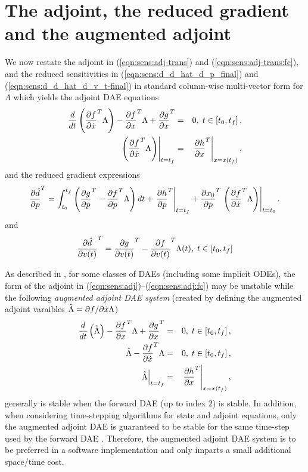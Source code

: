 \documentclass[pdf,ps2pdf,11pt]{SANDreport}
\begin{document}
%
\section{The adjoint, the reduced gradient and the augmented adjoint}
%

We now restate the adjoint in (\ref{eqn:sens:adj-trans}) and
(\ref{eqn:sens:adj-trans:fc}), and the reduced sensitivities in
(\ref{eqn:sens:d_d_hat_d_p_final}) and (\ref{eqn:sens:d_d_hat_d_v_t-final}) in
standard column-wise multi-vector form for $\Lambda$ which yields the adjoint
DAE equations
%
\begin{eqnarray}
\frac{d}{dt}\left( \displaystyle{\frac{\partial f}{\partial \dot{x}}}^T \Lambda \right)
- \displaystyle{\frac{\partial f}{\partial x}}^T \Lambda + \displaystyle{\frac{\partial g}{\partial x}}^T
& = & 0, \; t \in \left[ t_0, t_f \right],
\label{eqn:sens:adj} \\
\left.\left( \displaystyle{\frac{\partial f}{\partial \dot{x}}}^T \Lambda \right)\right|_{t=t_f}
& = & \left. \displaystyle{\frac{\partial h}{\partial x}}^T \right|_{x=x(t_f)},
\label{eqn:sens:adj:fc}
\end{eqnarray}
%
and the reduced gradient expressions
%
\begin{equation}
\displaystyle{\frac{\partial \hat{d}}{\partial p}}^T =
\int_{t_0}^{t_f} \left(
    \displaystyle{\frac{\partial g}{\partial p}}^T - \displaystyle{\frac{\partial f}{\partial p}}^T \Lambda
  \right) dt
  + \left. \displaystyle{\frac{\partial h}{\partial p}}^T \right|_{t=t_f}
  +\displaystyle{\frac{\partial x_0}{\partial p}}^T \left. \left( \displaystyle{\frac{\partial f}{\partial \dot{x}}}^T \Lambda \right) \right|_{t=t_0}.
\label{eqn:sens:d_d_hat_d_p_final-2}
\end{equation}
%
and
%
\begin{equation}
\displaystyle{\frac{\partial \hat{d}}{\partial v(t)}}^T =  \displaystyle{\frac{\partial g}{\partial v(t)}}^T - \displaystyle{\frac{\partial f}{\partial v(t)}}^T \Lambda(t), \; t\in[t_0,t_f]
\label{eqn:sens:d_d_hat_d_v_t-final-2}
\end{equation}
%

As described in {}\cite{adjoint-sens-2003}, for some classes of DAEs
(including some implicit ODEs), the form of the adjoint in
(\ref{eqn:sens:adj})--(\ref{eqn:sens:adj:fc}) may be unstable while the
following {}\textit{augmented adjoint DAE system} (created by defining the
augmented adjoint varaibles $\hat{\Lambda} = \partial f / \partial \dot{x} {}\Lambda$)
%
\begin{eqnarray}
\frac{d}{dt}\left( \hat{\Lambda} \right)
-  \displaystyle{\frac{\partial f}{\partial x}}^T \Lambda + \displaystyle{\frac{\partial g}{\partial x}}^T
& = & 0, \; t \in \left[ t_0, t_f \right],
\label{eqn:sens:aug-adj-de} \\
\hat{\Lambda} - \displaystyle{\frac{\partial f}{\partial \dot{x}}}^T \Lambda
& = & 0, \; t \in \left[ t_0, t_f \right],
\label{eqn:sens:aug-adj-ae} \\
\left. \hat{\Lambda} \right|_{t=t_f}
& = & \left. \displaystyle{\frac{\partial h}{\partial x}}^T \right|_{x=x(t_f)},
\label{eqn:sens:aug-adj:fc}
\end{eqnarray}
%
generally is stable when the forward DAE (up to index 2) is stable.  In
addition, when considering time-stepping algorithms for state and adjoint
equations, only the augmented adjoint DAE is guaranteed to be stable for the
same time-step used by the forward DAE {}\cite{adjoint-sens-2003}.  Therefore,
the augmented adjoint DAE system is to be preferred in a software
implementation and only imparts a small additional space/time cost.
\end{document}
